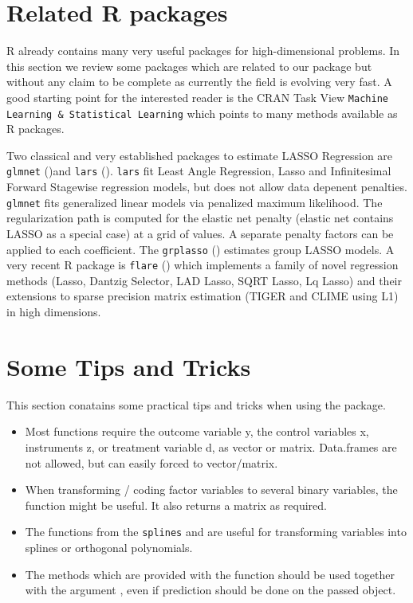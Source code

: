 \documentclass{amsart}
\newcommand{\Rpackage}[1]{{\texttt{#1}}}
\newcommand{\R}{{\normalfont\textsf{R }}{}}
\begin{document}
\section{Related \R packages}
\R already contains many very useful packages for high-dimensional problems. In this section we review some packages which are related to our package but without any claim to be complete as currently the field is evolving very fast. A good starting point for the interested reader is the CRAN Task View \texttt{Machine Learning & Statistical Learning} which points to many methods available as \R packages.

Two classical and very established packages to estimate LASSO Regression are \Rpackage{glmnet} (\cite{glmnet})and \Rpackage{lars} (\cite{lars}).  \Rpackage{lars} fit Least Angle Regression, Lasso and Infinitesimal Forward Stagewise regression models, but does not allow data depenent penalties. \Rpackage{glmnet} fits generalized linear models via penalized maximum likelihood. The regularization path is computed for the elastic net penalty (elastic net contains LASSO as a special case) at a grid of values. A separate penalty factors can be applied to each coefficient. The \Rpackage{grplasso} (\cite{grplasso}) estimates group LASSO models. A very recent \R package is \Rpackage{flare} (\cite{flare}) which implements a family of novel regression methods (Lasso, Dantzig Selector, LAD Lasso, SQRT Lasso, Lq Lasso) and their extensions to sparse precision matrix estimation (TIGER and CLIME using L1) in high dimensions.


\section{Some Tips and Tricks}
This section conatains some practical tips and tricks when using the package.

\begin{itemize}
 \item Most functions require the outcome variable y, the control variables x, instruments z, or treatment variable d, as vector or matrix. Data.frames are not allowed, but can easily forced to vector/matrix.
 \item When transforming / coding factor variables to several binary variables, the function  might be useful. It also returns a matrix as required.
 \item The functions   from the \Rpackage{splines} and  are useful for transforming variables into splines or orthogonal polynomials.
 \item The methods  which are provided with the function should be used together with the argument , even if prediction should be done on the passed object.
\end{itemize}
\end{document}
